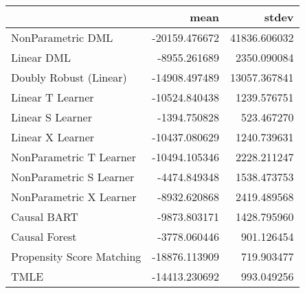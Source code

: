\begin{tabular}{lrr}
\toprule
{} &          mean &         stdev \\
\midrule
NonParametric DML         & -20159.476672 &  41836.606032 \\
Linear DML                &  -8955.261689 &   2350.090084 \\
Doubly Robust (Linear)    & -14908.497489 &  13057.367841 \\
Linear T Learner          & -10524.840438 &   1239.576751 \\
Linear S Learner          &  -1394.750828 &    523.467270 \\
Linear X Learner          & -10437.080629 &   1240.739631 \\
NonParametric T Learner   & -10494.105346 &   2228.211247 \\
NonParametric S Learner   &  -4474.849348 &   1538.473753 \\
NonParametric X Learner   &  -8932.620868 &   2419.489568 \\
Causal BART               &  -9873.803171 &   1428.795960 \\
Causal Forest             &  -3778.060446 &    901.126454 \\
Propensity Score Matching & -18876.113909 &    719.903477 \\
TMLE                      & -14413.230692 &    993.049256 \\
\bottomrule
\end{tabular}
